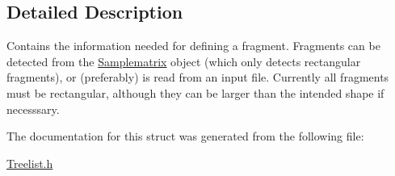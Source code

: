\subsection{Detailed Description}
Contains the information needed for defining a fragment. Fragments can be detected from the \hyperlink{class_samplematrix}{Samplematrix} object (which only detects rectangular fragments), or (preferably) is read from an input file. Currently all fragments must be rectangular, although they can be larger than the intended shape if necesssary. 

The documentation for this struct was generated from the following file\+:\begin{DoxyCompactItemize}
\item 
\hyperlink{_treelist_8h}{Treelist.\+h}\end{DoxyCompactItemize}
